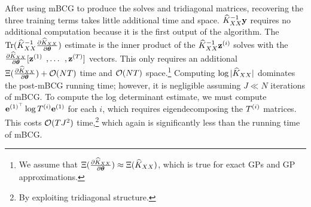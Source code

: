
After using mBCG to produce the solves and tridiagonal matrices, recovering the three training terms takes little additional time and space.
$\widehat{K}_{XX}^{-1}\mathbf{y}$ requires no additional computation because it is the first output of the algorithm.
The $\tr{\trainK^{-1}\frac{\partial \trainK}{\partial \btheta}}$ estimate is the inner product of the $\widehat{K}_{XX}^{-1} \mathbf{z}^{(i)}$ solves with the $\frac{\partial \widehat{K}_{XX}}{\partial \boldsymbol{\theta}}[\mathbf{z}^{(1)} \:\:, \ldots \:\:, \mathbf{z}^{(T)}]$ vectors.
This only requires an additional $\mmm{\frac{\partial \trainK}{\partial \btheta}} + \bigo{NT}$ time and $\bigo{NT}$ space.\footnote{
	We assume that $\Xi (\frac{\partial \widehat{K}_{XX}}{\partial \boldsymbol{\theta}}) \approx \Xi (\widehat{K}_{XX})$, which is true for exact GPs and GP approximations.
}
Computing $\log \vert \widehat{K}_{XX} \vert$ dominates the post-mBCG running time; however, it is negligible assuming $J \ll N$ iterations of mBCG.
To compute the log determinant estimate, we must compute $\mathbf{e}^{(1)^\top} \log T^{(i)} \mathbf{e}^{(1)}$ for each $i$, which requires eigendecomposing the $T^{(i)}$ matrices.
This costs $\bigo{T J^2}$ time,\footnote{
  By exploiting tridiagonal structure.
} which again is significantly less than the running time of mBCG.
